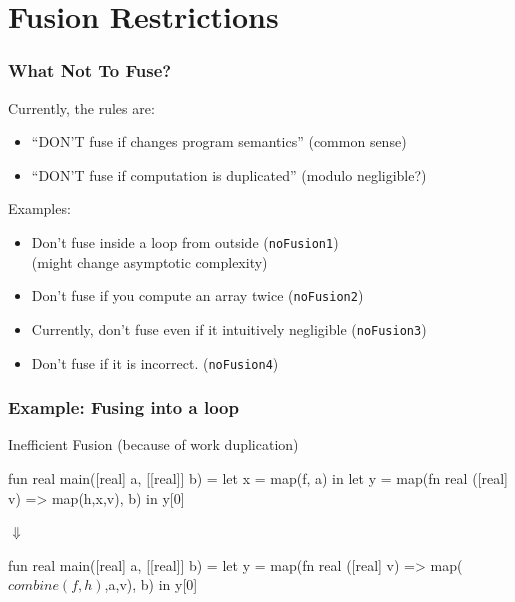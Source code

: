 \documentclass{beamer}
\newcommand{\mymath}[1]{$ #1 $}
\begin{document}
\section{Fusion Restrictions}

\begin{frame}[fragile,t]
  \frametitle{What Not To Fuse?}

  Currently, the rules are:

  \begin{itemize}
  \item ``DON'T fuse if changes program semantics'' (common sense)
  \item ``DON'T fuse if computation is duplicated'' (modulo negligible?)
  \end{itemize}

  \bigskip

  Examples:
  \begin{itemize}
  \item Don't fuse inside a loop from outside (\texttt{noFusion1})\\
    (might change asymptotic complexity) \smallskip

  \item Don't fuse if you compute an array twice (\texttt{noFusion2})\smallskip

  \item Currently, don't fuse even if it intuitively negligible (\texttt{noFusion3})\smallskip

  \item Don't fuse if it is incorrect. (\texttt{noFusion4})
  \end{itemize}

\end{frame}

\begin{frame}[fragile,t]
  \frametitle{Example: Fusing into a loop}

  \begin{block}{Inefficient Fusion (because of work duplication)}
\begin{center}
      \begin{colorcode}[fontsize=\scriptsize]
fun real main([real] a, [[real]] b) =
let x      = map(f, a)                 in
let y      = map(fn real ([real] v) =>
                 map(h,x,v), b)        in
y[0]
      \end{colorcode}
$\Downarrow$
      \begin{colorcode}[fontsize=\scriptsize]
fun real main([real] a, [[real]] b) =
let y      = map(fn real ([real] v) =>
                 map(\mymath{combine(f,h)},a,v), b) in
y[0]
      \end{colorcode}
\end{center}
  \end{block}
\end{frame}
\end{document}
